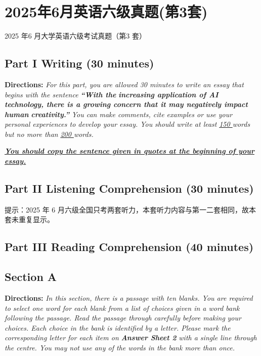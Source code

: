 \documentclass[UTF8,11pt]{ctexart}
\begin{document}
\section*{2025年6月英语六级真题(第3套)}
2025 年6 月大学英语六级考试真题（第3 套）


\subsection*{\textbf{Part I Writing} \textbf{(30 minutes)}}


\textbf{Directions:}\textit{ For this part, you are allowed 30 minutes to write an essay that begins with the sentence }\textbf{\textit{“With the}} \textbf{\textit{increasing application of AI technology, there is a growing concern that it may negatively impact human}} \textbf{\textit{creativity.”}}\textit{ You can make comments, cite examples or use your personal experiences to develop your essay. You} \textit{should write at least }\textit{\uline{150 }}\textit{words but no more than }\textit{\uline{200 }}\textit{words.}


\textbf{\textit{\uline{You should copy the sentence given in quotes at the beginning of your essay.}}}


\subsection*{\textbf{Part II} \textbf{Listening Comprehension} \textbf{(30 minutes)}}


提示：2025 年 6 月六级全国只考两套听力，本套听力内容与第一二套相同，故本套未重复显示。


\subsection*{\textbf{Part III Reading Comprehension (40 minutes)}}


\subsection*{\textbf{Section A}}


\textbf{Directions:} \textit{In this section, there is a passage with ten blanks. You are required to select one word for each blank} \textit{from a list of choices given in a word bank following the passage. Read the passage through carefully before making} \textit{your choices. Each choice in the bank is identified by a letter. Please mark the corresponding letter for each item on} \textbf{\textit{Answer Sheet 2}}\textit{ with a single line through the centre. You may not use any of the words in the bank more than once.}
\end{document}
